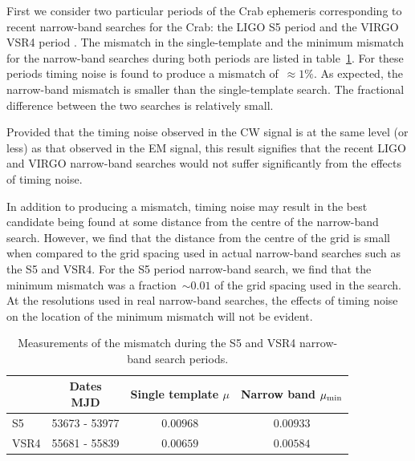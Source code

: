 \documentclass[../full_thesis/full_thesis.tex]{subfiles}
\begin{document}
First we consider two particular periods of the Crab ephemeris corresponding to
recent narrow-band searches for the Crab: the LIGO S5 period \citep{ligo2008}
and the VIRGO VSR4 period \citep{LIGO2015}. The mismatch in the single-template
and the minimum mismatch for the narrow-band searches during both periods are
listed in table~\ref{tab: Results}. For these periods timing noise is
found to produce a mismatch of~$\approx 1\%$. As expected, the narrow-band
mismatch is smaller than the single-template search. The fractional difference
between the two searches is relatively small.

Provided that the timing noise observed in the CW signal is at the same level
(or less) as that observed in the EM signal, this result signifies that the
recent LIGO and VIRGO narrow-band searches would not suffer significantly
from the effects of timing noise.

In addition to producing a mismatch, timing noise may result in the best
candidate being found at some distance from the centre of the narrow-band
search.  However, we find that the distance from the centre of the grid is
small when compared to the grid spacing used in actual narrow-band searches
such as the S5 and VSR4.  For the S5 period narrow-band search, we find that
the minimum mismatch was a fraction~$\sim 0.01$ of the grid spacing used in the
\citet{ligo2008} search.  At the resolutions used in real narrow-band searches,
the effects of timing noise on the location of the minimum mismatch will not be
evident.

\begingroup
\small
\begin{table}[ht]
\centering
\begin{tabular}{lccc}
    &
    \specialcell{Dates \\ MJD} &
    \specialcell{Single  template \\ $\mu$} &
    \specialcell{Narrow band \\ $\mu_{\mathrm{min}}$} \\ \hline
S5 & 53673 - 53977 & $0.00968$ & $0.00933$ \\
VSR4 & 55681 - 55839 & $0.00659$ & $0.00584$ \\
\end{tabular}
\caption{Measurements of the mismatch during the S5 and VSR4 narrow-band search
         periods.}
\label{tab: Results}
\end{table}
\endgroup
\end{document}
